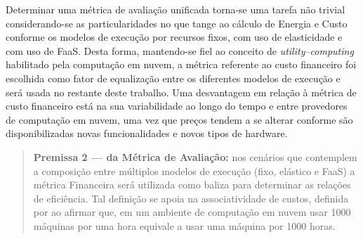 \documentclass[english,brazilian]{UNISINOSmonografia} %
\begin{document}
Determinar uma métrica de avaliação unificada torna-se uma tarefa não trivial considerando-se as particularidades no que tange ao cálculo de Energia e Custo conforme os modelos de execução por recursos fixos, com uso de elasticidade e com uso de FaaS.
Desta forma, mantendo-se fiel ao conceito de \textit{utility--computing} habilitado pela computação em nuvem, a métrica referente ao custo financeiro foi escolhida como fator de equalização entre os diferentes modelos de execução e será usada no restante deste trabalho.
Uma desvantagem em relação à métrica de custo financeiro está na sua variabilidade ao longo do tempo e entre provedores de computação em nuvem, uma vez que preços tendem a se alterar conforme são disponibilizadas novas funcionalidades e novos tipos de hardware.
\begin{quote}
	\textbf{Premissa 2 --- da Métrica de Avaliação:} nos cenários que contemplem a composição entre múltiplos modelos de execução (fixo, elástico e FaaS) a métrica Financeira será utilizada como baliza para determinar as relações de eficiência. Tal definição se apoia na associatividade de custos, definida por  ao afirmar que, em um ambiente de computação em nuvem usar 1000 máquinas por uma hora equivale a usar uma máquina por 1000 horas.
\end{quote}
\end{document}
